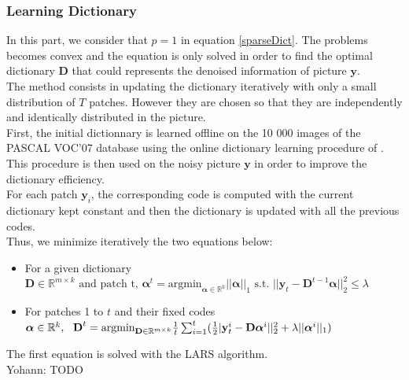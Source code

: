 \documentclass{ipol}
\newcommand{\psize}{m}
\newcommand{\dsize}{k}
\newcommand{\dict}{\textbf{D}}
\newcommand{\code}{\bm{\alpha}}
\newcommand{\pnorm}{p}
\newcommand{\noi}{\textbf{y}}
\newcommand{\RR}{\mathbb{R}}
\newcommand{\argmin}{\text{argmin}}
\begin{document}
\subsubsection{Learning Dictionary}

In this part, we consider that $\pnorm = 1$ in equation \eqref{sparseDict}. The problems becomes convex and the equation is only solved in order to find the optimal dictionary $\dict$ that could represents the denoised information of picture $\noi$.\\
The method consists in updating the dictionary iteratively with only a small distribution of $T$ patches. However they are chosen so that they are independently and identically distributed in the picture.\\
First, the initial dictionnary is learned offline on the 10 000 images of the PASCAL VOC'07 database using the  online dictionary learning procedure of \cite{onlineLearning}. This procedure is then used on the noisy picture $\noi$ in order to improve the dictionary efficiency.\\
For each patch $\noi_i$, the corresponding code is computed with the current dictionary kept constant and then the dictionary is updated with all the previous codes.\\
Thus, we minimize iteratively the two equations below:
\begin{itemize}
	\item For a given dictionary $\dict \in \RR^{\psize \times \dsize} \text{ and patch t, } \code^t = \argmin_{\code \in \RR^\dsize} ||\code||_1 \text{ s.t. } ||\noi_t - \dict^{t-1} \code||_2^2 \leq \lambda$
	\item For patches 1 to $t$ and their fixed codes $\code \in \RR^\dsize , \ \ \dict^{t}= \argmin_{\dict \in \RR^{\psize \times \dsize}} \frac{1}{t} \sum_{i=1}^t (\frac{1}{2}|\textbf{\noi}_t^i - \dict \code^i||^2_2 + \lambda ||\code^i||_1)$
\end{itemize}
The first equation is solved with the LARS algorithm.\\
{\color{red} Yohann: TODO}
\end{document}
